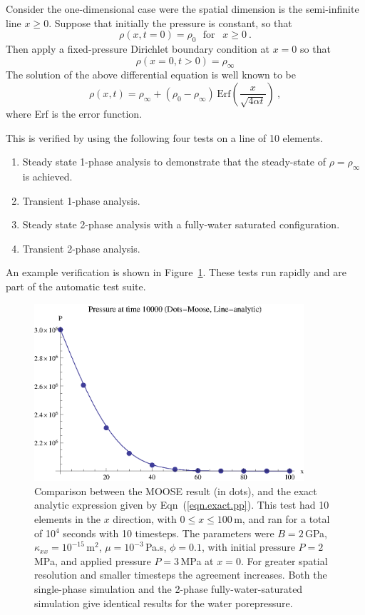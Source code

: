 \documentclass[]{scrreprt}
\begin{document}
Consider the one-dimensional case were the spatial dimension is the
semi-infinite line $x\geq 0$.  Suppose that initially the pressure is
constant, so that
\begin{equation}
\rho(x, t=0) = \rho_{0} \ \ \ \mbox{for }\ \ x\geq 0 \ .
\end{equation}
Then apply a fixed-pressure Dirichlet boundary condition at $x=0$ so
that
\begin{equation}
\rho(x=0, t>0) = \rho_{\infty}
\end{equation}
The solution of the above differential equation is well known to be
\begin{equation}
\rho(x, t) = \rho_{\infty} + (\rho_{0} -
\rho_{\infty})\,\mbox{Erf}\left( \frac{x}{\sqrt{4\alpha t}} \right) \ ,
\label{eqn.exact.pp}
\end{equation}
where Erf is the error function.

This is verified by using the following four tests on a line of
10 elements.
\begin{enumerate}
\item Steady state 1-phase analysis to demonstrate that the
  steady-state of $\rho = \rho_{\infty}$ is achieved.
\item Transient 1-phase analysis.
\item Steady state 2-phase analysis with a fully-water saturated configuration.
\item Transient 2-phase analysis.
\end{enumerate}
An example verification is shown in Figure~\ref{pressure_pulse.fig}.
These tests run rapidly and are part of the automatic test suite.

\begin{figure}[htb]
\centering
\includegraphics[width=10cm]{pressure_pulse.eps}
\caption{Comparison between the MOOSE result (in dots), and the
  exact analytic expression given by Eqn~(\ref{eqn.exact.pp}).  This
  test had 10 elements in the $x$ direction, with $0\leq x \leq
  100$\,m, and ran for a total of 
  10$^4$ seconds with 10 timesteps.  The parameters were $B=2$\,GPa,
  $\kappa_{xx}=10^{-15}$\,m$^{2}$, $\mu=10^{-3}$\,Pa.s, $\phi=0.1$,
  with initial pressure $P=2$\,MPa, and applied pressure $P=3$\,MPa at
  $x=0$.  For greater spatial resolution and smaller timesteps the
  agreement increases.  Both the single-phase simulation and the
  2-phase fully-water-saturated simulation give identical results for
  the water porepressure.}
\label{pressure_pulse.fig}
\end{figure}
\end{document}
